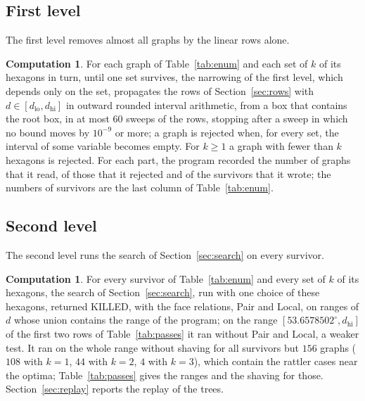 \documentclass[12pt]{amsart}
\theoremstyle{definition}
\newtheorem{step}[theorem]{Computation}
\theoremstyle{plain}
\theoremstyle{definition}
\newcommand{\dlo}{d_{\mathrm{lo}}}
\newcommand{\dhi}{d_{\mathrm{hi}}}
\newcommand{\codemap}[1]{\ignorespaces}
\begin{document}
\subsection{First level}\label{sec:stageA}
The first level removes almost all graphs by the linear rows alone.

\begin{step}\label{comp:stageA}\codemap{code/impl1/stageA_check.sh > code/impl1/out/stageA_parts.txt}
For each graph of Table~\ref{tab:enum} and each set of $k$ of its hexagons in turn, until one set survives, the narrowing of the first level, which depends only on the set, propagates the rows of Section~\ref{sec:rows} with $d\in[\dlo,\dhi]$ in outward rounded interval arithmetic, from a box that contains the root box, in at most $60$ sweeps of the rows, stopping after a sweep in which no bound moves by $10^{-9}$ or more; a graph is rejected when, for every set, the interval of some variable becomes empty. For $k\ge1$ a graph with fewer than $k$ hexagons is rejected. For each part, the program recorded the number of graphs that it read, of those that it rejected and of the survivors that it wrote; the numbers of survivors are the last column of Table~\ref{tab:enum}.
\end{step}

\subsection{Second level}\label{sec:level2}
The second level runs the search of Section~\ref{sec:search} on every survivor.

\begin{step}\label{comp:level2}\codemap{code/impl1/replay_all.sh > code/impl1/out/guarded/replay_summary.txt, code/impl1/coverage_join.sh > code/impl1/out/guarded/coverage_join.txt}
For every survivor of Table~\ref{tab:enum} and every set of $k$ of its hexagons, the search of Section~\ref{sec:search}, run with one choice of these hexagons, returned KILLED, with the face relations, Pair and Local, on ranges of $d$ whose union contains the range of the program; on the range $[53.6578502^\circ,\dhi]$ of the first two rows of Table~\ref{tab:passes} it ran without Pair and Local, a weaker test. It ran on the whole range without shaving for all survivors but $156$ graphs ($108$ with $k=1$, $44$ with $k=2$, $4$ with $k=3$), which contain the rattler cases near the optima; Table~\ref{tab:passes} gives the ranges and the shaving for those. Section~\ref{sec:replay} reports the replay of the trees.
\end{step}
\end{document}
